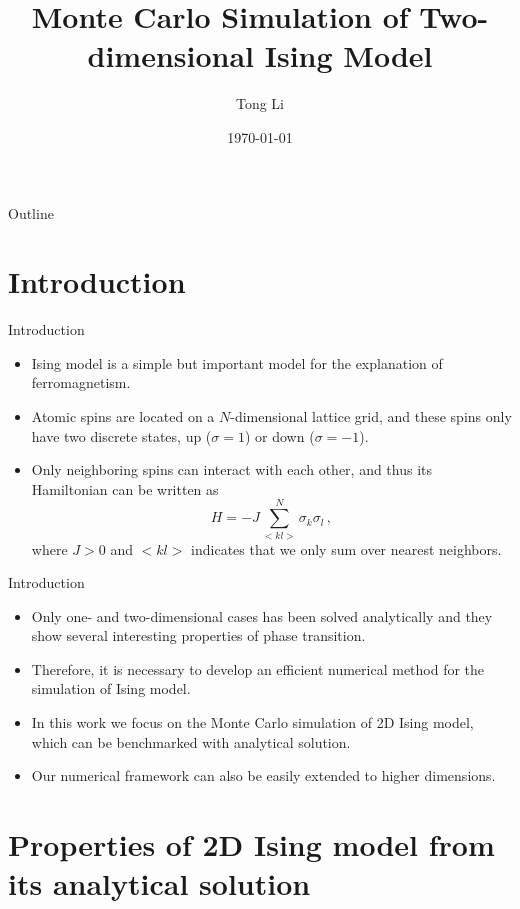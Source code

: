 \documentclass{beamer}
\title{Monte Carlo Simulation of Two-dimensional Ising Model}
\author{Tong Li}
\institute{Department of Physics \& Astronomy \\ Michigan State University }
\date{\today}
\begin{document}
\beamertemplatenavigationsymbolsempty

\thispagestyle{empty} 
\begin{frame}
\titlepage
\end{frame}

\begin{frame}{Outline}
\tableofcontents
\end{frame} 

\section{Introduction}	
\begin{frame}{Introduction}
\begin{itemize}
	\item <1-> Ising model is a simple but important model for the explanation of ferromagnetism.  
	\item <2-> 
	Atomic spins are located on a $N$-dimensional lattice grid, 
	and these spins only have two discrete states, up ($\sigma=1$) or down ($\sigma=-1$). 
	\item <3-> 
	Only neighboring spins can interact with each other, and thus its Hamiltonian can be written as 
	\begin{equation}\label{eq:hamiltonian}
	H=-J\sum_{<kl>}^{N}\sigma_k\sigma_l\,, 
	\end{equation}
	where $J>0$ and $<kl>$ indicates that we only sum over nearest neighbors. 
\end{itemize}
\end{frame}

\begin{frame}{Introduction}
\begin{itemize}
	\item <1-> Only one- and two-dimensional cases has been solved analytically and they show several interesting properties of phase transition. 
	\item <1-> Therefore, it is necessary to develop an efficient numerical method for the simulation of Ising model. 
	\item <2-> In this work we focus on the Monte Carlo simulation of 2D Ising model, which can be benchmarked with analytical solution. 
	\item <3-> Our numerical framework can also be easily extended to higher dimensions. 
\end{itemize}
\end{frame}

\section{Properties of 2D Ising model from its analytical solution}
\end{document}
